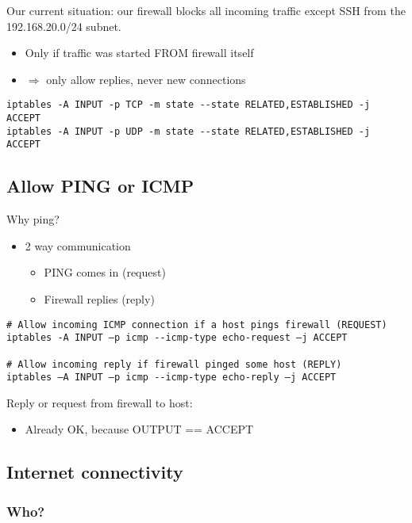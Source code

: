 \documentclass{article}
\begin{document}
Our current situation: our firewall blocks all incoming traffic except SSH from the 192.168.20.0/24 subnet.

\begin{itemize}
    \item Only if traffic was started FROM firewall itself
    \item $\Rightarrow$ only allow replies, never new connections
\end{itemize}

\begin{verbatim}
iptables -A INPUT -p TCP -m state --state RELATED,ESTABLISHED -j ACCEPT
iptables -A INPUT -p UDP -m state --state RELATED,ESTABLISHED -j ACCEPT
\end{verbatim}

\subsection{Allow PING or ICMP}

Why ping?

\begin{itemize}
    \item 2 way communication
    \begin{itemize}
        \item PING comes in (request)
        \item Firewall replies (reply)
    \end{itemize}
\end{itemize}

\begin{verbatim}
# Allow incoming ICMP connection if a host pings firewall (REQUEST)
iptables -A INPUT –p icmp --icmp-type echo-request –j ACCEPT

# Allow incoming reply if firewall pinged some host (REPLY)
iptables –A INPUT –p icmp --icmp-type echo-reply –j ACCEPT
\end{verbatim}

Reply or request from firewall to host:

\begin{itemize}
    \item Already OK, because OUTPUT == ACCEPT
\end{itemize}

\subsection{Internet connectivity}

\subsubsection{Who?}
\end{document}

